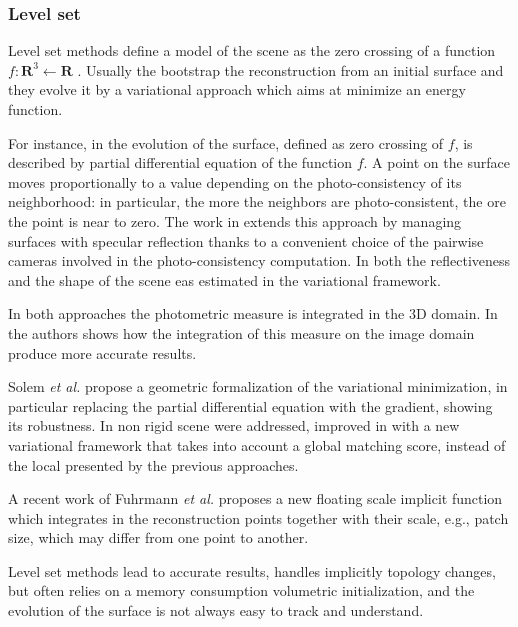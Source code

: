 \subsubsection{Level set}
Level set methods define a model of the scene as the zero crossing of a function $f:\mathbf{R}^3\leftarrow\mathbf{R}$ \cite{faugeras2002variational,jin2002variational,yezzi2003stereoscopic,fuhrmann2014floating,solem2005geometric,yoon2010joint,pons2007multi}. 
Usually the bootstrap the reconstruction from an initial surface and they evolve it by a variational approach which aims at minimize an energy function.

For instance, in \cite{faugeras2002variational} the evolution of the surface, defined as zero crossing of $f$, is described by partial differential equation of the function $f$. A point on the surface moves proportionally to a value depending on the photo-consistency of its neighborhood: in particular, the more the neighbors are photo-consistent, the ore the point is near to zero.
The work in \cite{jin2002variational} extends this approach by managing surfaces with specular reflection thanks to a convenient choice of the pairwise cameras involved in the photo-consistency computation. In \cite{yoon2010joint} both the reflectiveness and the shape of the scene eas estimated in the variational framework.

In both approaches the photometric measure is integrated in the 3D domain. In \cite{yezzi2003stereoscopic} the authors shows how the integration of this measure on the image domain produce more accurate results.

Solem \emph{et al.} \cite{solem2005geometric} propose a geometric formalization of the variational minimization, in particular replacing the partial differential equation with the gradient, showing its robustness.
In \cite{pons2005modelling} non rigid scene were addressed, improved in \cite{pons2007multi}  with a new variational framework that takes into account a global matching score, instead of the local presented by the previous approaches.

A recent work of Fuhrmann \emph{et al.} proposes a new floating scale implicit function which integrates in the reconstruction  points together with their scale, e.g., patch size, which may differ from one point to another. 


Level set methods lead to accurate results, handles implicitly topology changes, but often relies on a memory consumption volumetric initialization, and the evolution of the surface is not always easy to track and understand.
